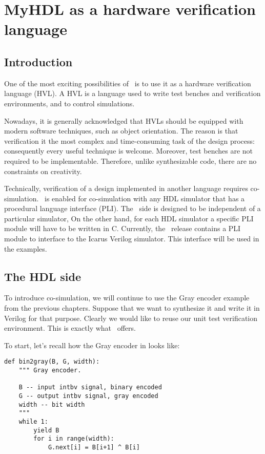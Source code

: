 \chapter{MyHDL as a hardware verification language}

\section{Introduction}

One of the most exciting possibilities of \myhdl\
is to use it as a hardware verification language (HVL).
A HVL is a language used to write test benches and
verification environments, and to control simulations.

Nowadays, it is generally acknowledged that HVLs should be equipped
with modern software techniques, such as object orientation. The
reason is that verification it the most complex and time-consuming
task of the design process: consequently every useful technique is
welcome. Moreover, test benches are not required to be
implementable. Therefore, unlike synthesizable code, there
are no constraints on creativity.

Technically, verification of a design implemented in
another language requires co-simulation. \myhdl\ is 
enabled for co-simulation with any HDL simulator that
has a procedural language interface (PLI). The \myhdl\
side is designed to be independent of a particular
simulator, On the other hand, for each HDL simulator a specific
PLI module will have to be written in C. Currently,
the \myhdl\ release contains a PLI module to interface
to the Icarus Verilog simulator. This interface will
be used in the examples.

\section{The HDL side}

To introduce co-simulation, we will continue to use the Gray encoder
example from the previous chapters. Suppose that we want to
synthesize it and write it in Verilog for that purpose. Clearly we would
like to reuse our unit test verification environment. This is exactly
what \myhdl\ offers.

To start, let's recall how the Gray encoder in \myhdl{} looks like:

\begin{verbatim}
def bin2gray(B, G, width):
    """ Gray encoder.

    B -- input intbv signal, binary encoded
    G -- output intbv signal, gray encoded
    width -- bit width
    """
    while 1:
        yield B
        for i in range(width):
            G.next[i] = B[i+1] ^ B[i]

\end{verbatim}

